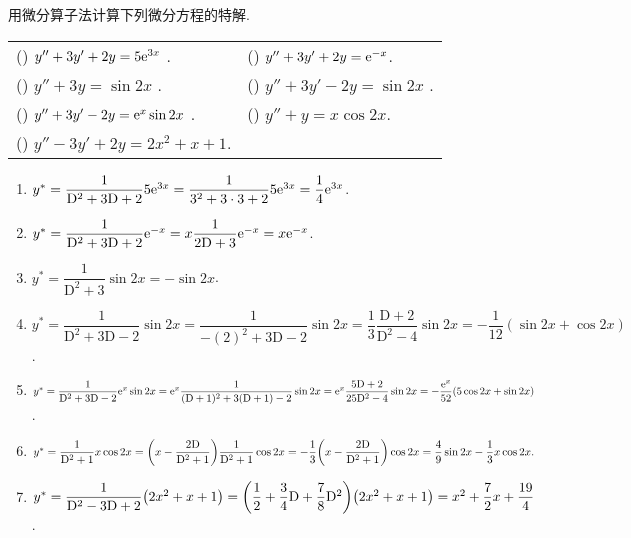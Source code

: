 \begin{example}
    用微分算子法计算下列微分方程的特解.
    \setcounter{magicrownumbers}{0}
    \begin{table}[H]
        \centering
        \begin{tabular}{l | l}
            (\rownumber{}) $y''+3y'+2y=5\mathrm{e} ^{3x}$      . & (\rownumber{}) $y''+3y'+2y=\mathrm{e} ^{-x}$.     \\
            (\rownumber{}) $y''+3y=\sin 2x$            . & (\rownumber{}) $y''+3y'-2y=\sin 2x$     . \\
            (\rownumber{}) $y''+3y'-2y=\mathrm{e} ^{x}\sin 2x$ . & (\rownumber{}) $y''+y=x\cos 2x$.          \\
            (\rownumber{}) $y''-3y'+2y=2x^2+x+1$.
        \end{tabular}
    \end{table}
\end{example}
\begin{solution}
    \begin{enumerate}[label=(\arabic{*})]
        \item $y^*=\dfrac{1}{\mathrm{D}^2+3\mathrm{D}+2}5\mathrm{e} ^{3x}=\dfrac{1}{3^2+3\cdot 3+2}5\mathrm{e} ^{3x}=\dfrac{1}{4}\mathrm{e} ^{3x}$.
        \item $y^*=\dfrac{1}{\mathrm{D}^2+3\mathrm{D}+2}\mathrm{e} ^{-x}=x\dfrac{1}{2\mathrm{D}+3}\mathrm{e} ^{-x}=x\mathrm{e} ^{-x}$.
        \item $y^*=\dfrac{1}{\mathrm{D}^2+3}\sin 2x=-\sin 2x$.
        \item $y^*=\dfrac{1}{\mathrm{D}^2+3\mathrm{D}-2}\sin 2x=\dfrac{1}{-(2)^2+3\mathrm{D}-2}\sin 2x=\dfrac{1}{3}\dfrac{\mathrm{D}+2}{\mathrm{D}^2-4}\sin 2x=-\dfrac{1}{12}(\sin2x+\cos 2x)$.
        \item $y^*=\dfrac{1}{\mathrm{D}^2+3\mathrm{D}-2}\mathrm{e} ^{x}\sin 2x=\mathrm{e} ^{x}\dfrac{1}{(\mathrm{D}+1)^2+3(\mathrm{D}+1)-2}\sin 2x=\mathrm{e} ^{x}\dfrac{5\mathrm{D}+2}{25\mathrm{D}^2-4}\sin 2x= -\dfrac{\mathrm{e} ^{x}}{52}(5\cos2x+\sin2x)$.
        \item $y^*=\dfrac{1}{\mathrm{D}^2+1}x\cos2x=\qty(x-\dfrac{2\mathrm{D}}{\mathrm{D}^2+1})\dfrac{1}{\mathrm{D}^2+1}\cos2x=-\dfrac{1}{3}\qty(x-\dfrac{2\mathrm{D}}{\mathrm{D}^2+1})\cos 2x=\dfrac{4}{9}\sin 2x-\dfrac{1}{3}x\cos 2x.$
        \item $y^*=\dfrac{1}{\mathrm{D}^2-3\mathrm{D}+2}\qty(2x^2+x+1)=\qty(\dfrac{1}{2}+\dfrac{3}{4}\mathrm{D}+\dfrac{7}{8}\mathrm{D}^2)\qty(2x^2+x+1)=x^2+\dfrac{7}{2}x+\dfrac{19}{4}$.
    \end{enumerate}
\end{solution}

